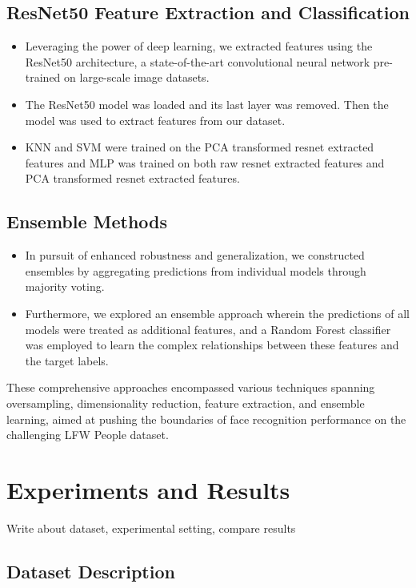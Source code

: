 \documentclass[a4paper]{article}
\theoremstyle{plain}
\theoremstyle{definition}
\begin{document}
\subsection{ResNet50 Feature Extraction and Classification}
   \begin{itemize}
       \item Leveraging the power of deep learning, we extracted features using the ResNet50 architecture, a state-of-the-art convolutional neural network pre-trained on large-scale image datasets.
       \item The ResNet50 model was loaded and its last layer was removed. Then the model was used to extract features from our dataset. 
       \item KNN and SVM were trained on the PCA transformed resnet extracted features and MLP was trained on both raw resnet extracted features and PCA transformed resnet extracted features.
   \end{itemize}

\subsection{Ensemble Methods}
   \begin{itemize}
       \item In pursuit of enhanced robustness and generalization, we constructed ensembles by aggregating predictions from individual models through majority voting.
       \item Furthermore, we explored an ensemble approach wherein the predictions of all models were treated as additional features, and a Random Forest classifier was employed to learn the complex relationships between these features and the target labels.
   \end{itemize}

These comprehensive approaches encompassed various techniques spanning oversampling, dimensionality reduction, feature extraction, and ensemble learning, aimed at pushing the boundaries of face recognition performance on the challenging LFW People dataset.
	\newpage
 
	\section{Experiments and Results}
	\label{sec:exp}
	Write about dataset, experimental setting, compare results
	
\subsection{Dataset Description}
\end{document}
